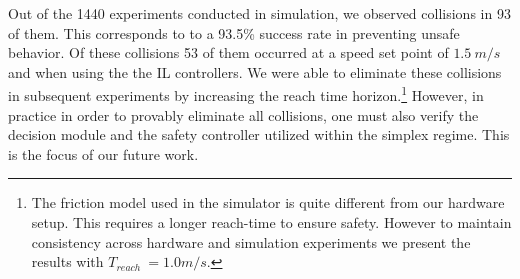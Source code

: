 \documentclass[manuscript,screen,review]{acmart}
\begin{document}



Out of the 1440 experiments conducted in simulation, we observed collisions in 93 of them. This corresponds to to a 93.5\% success rate in preventing unsafe behavior. Of these collisions 53 of them occurred at a speed set point of $1.5 \ m/s$ and when using the the IL controllers. We were able to eliminate these collisions in subsequent experiments by increasing the reach time horizon.\footnote{The friction model used in the simulator is quite different from our hardware setup. This requires a longer reach-time to ensure safety. However to maintain consistency across hardware and simulation experiments we present the results with $T_{reach} \ = 1.0 m/s.$} However, in practice in order to provably eliminate all collisions, one must also verify the decision module and the safety controller utilized within the simplex regime. This is the focus of our future work.
\end{document}
